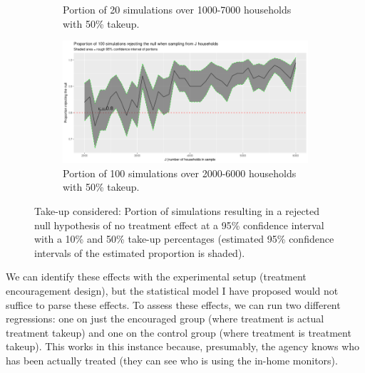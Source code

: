 \documentclass[12pt]{article}
\begin{document}
\begin{figure}[h!]
\begin{subfigure}{\widthfrac\textwidth}
    \caption{Portion of 20 simulations over 1000-7000 households with 50\% takeup.}
    \label{fig1-3c}
  \end{subfigure}
\begin{subfigure}{\widthfrac\textwidth}
    \centering
    \includegraphics[width=\textwidth]{"1-2_simulations_100_2000-to-6000_takeup-0.5"}
    \caption{Portion of 100 simulations over 2000-6000 households with 50\% takeup.}
    \label{fig1-3d}
  \end{subfigure}
\caption{Take-up considered: Portion of simulations resulting in a rejected null hypothesis of no treatment effect at a 95\% confidence interval with a 10\% and 50\% take-up percentages (estimated 95\% confidence intervals of the estimated proportion is shaded).}
\label{fig1-3}
\end{figure}
\FloatBarrier


\vem
{}

We can identify these effects with the experimental setup (treatment encouragement design), but the statistical model I have proposed would not suffice to parse these effects. To assess these effects, we can run two different regressions: one on just the encouraged group (where treatment is actual treatment takeup) and one on the control group (where treatment is treatment takeup). This works in this instance because, presumably, the agency knows who has been actually treated (they can see who is using the in-home monitors).
\end{document}
